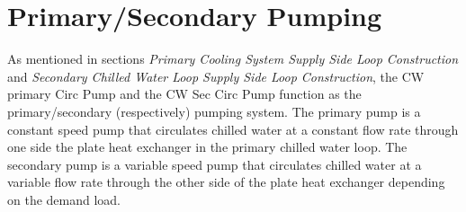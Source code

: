 \section{Primary/Secondary Pumping}\label{primarysecondary-pumping}

As mentioned in sections \emph{Primary Cooling System Supply Side Loop Construction} and \emph{Secondary Chilled Water Loop Supply Side Loop Construction}, the CW primary Circ Pump and the CW Sec Circ Pump function as the primary/secondary (respectively) pumping system. The primary pump is a constant speed pump that circulates chilled water at a constant flow rate through one side the plate heat exchanger in the primary chilled water loop. The secondary pump is a variable speed pump that circulates chilled water at a variable flow rate through the other side of the plate heat exchanger depending on the demand load.
